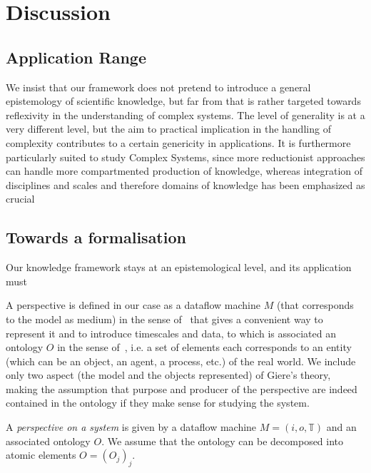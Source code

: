 \documentclass[runningheads,a4paper]{llncs2e/llncs}
\begin{document}
\section{Discussion}



\subsection{Application Range}

We insist that our framework does not pretend to introduce a general epistemology of scientific knowledge, but far from that is rather targeted towards reflexivity in the understanding of complex systems. The level of generality is at a very different level, but the aim to practical implication in the handling of complexity contributes to a certain genericity in applications. It is furthermore particularly suited to study Complex Systems, since more reductionist approaches can handle more compartmented production of knowledge, whereas integration of disciplines and scales and therefore domains of knowledge has been emphasized as crucial 


\subsection{Towards a formalisation}

Our knowledge framework stays at an epistemological level, and its application must 

A perspective is defined in our case as a dataflow machine $M$ (that corresponds to the model as medium) in the sense of~\cite{golden2012modeling} that gives a convenient way to represent it and to introduce timescales and data, to which is associated an ontology $O$ in the sense of~\cite{livet2010}, i.e. a set of elements each corresponds to an entity (which can be an object, an agent, a process, etc.) of the real world. We include only two aspect (the model and the objects represented) of Giere's theory, making the assumption that purpose and producer of the perspective are indeed contained in the ontology if they make sense for studying the system.

A \emph{perspective on a system} is given by a dataflow machine $M = (i,o,\mathbb{T})$ and an associated ontology $O$. We assume that the ontology can be decomposed into atomic elements $O=(O_j)_j$.
\end{document}
